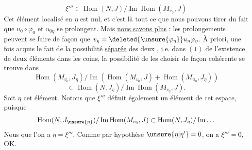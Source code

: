 \[
\xi'''\in\operatorname{Hom}(N,J)/\operatorname{Im}\operatorname{Hom}(M_{v_0},J)
\]
 Cet élément localisé en $\eta$ est nul,  et
c'est là tout ce que nous pouvons tirer du
fait que $u_0\circ\varphi_0$ et $u_{0\eta}$ se prolongent. Mais
\uline{nous savons plus} : les prolongements  peuvent se faire
de façon que $v_\eta=\deleted{\unsure{\varphi_\eta}}u_\eta\varphi_\eta$. À priori,
 une fois acquis le fait de la possibilité
\uline{séparée} des deux , i.e. dans $(1)$
de l'existence de deux éléments dans les
coins, la \inserted{$\unsure{\Rightarrow}$} possibilité de les choisir de
façon cohérente se trouve dans
\[
\operatorname{Hom}(M_{v_0},J_\eta)/\operatorname{Im}
(\operatorname{Hom}(M_{v_0},J)+\operatorname{Hom}(M_{u_0},J_\eta))
\]
\[
\subset\operatorname{Hom}(N,J_\eta)/\operatorname{Im}\operatorname{Hom}(M_{v_0},J).
\]
Soit $\eta$ cet élément. Notons que $\xi'''$ définit
également un élément de cet espace,
puisque
\[
\operatorname{Hom}(N,J_{\unsure{\eta}})/\operatorname{Im}\operatorname{Hom}(M_{v_0},J)
\subset\operatorname{Hom}(N,J_\eta)/\operatorname{Im}\ldots
\]
Nous  que l'on a $\eta=\xi'''$. Comme
par hypothèse $\unsure{\eta|\eta'}=0$, on a $\xi'''=0$, OK.
